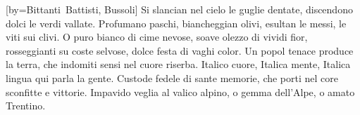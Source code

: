 [by={Bittanti\ Battisti, Bussoli}]
\chordsoff
\beginverse
Si slancian nel cielo le guglie dentate,
discendono dolci le verdi vallate.
Profumano paschi, biancheggian olivi,
esultan le messi, le viti sui clivi.
\endverse
\beginchorus
O puro bianco di cime nevose,
soave olezzo di vividi fior,
rosseggianti su coste selvose,
dolce festa di vaghi color.
\endchorus
\beginverse
Un popol tenace produce la terra,
che indomiti sensi nel cuore riserba.
Italico cuore, Italica mente,
Italica lingua qui parla la gente.
\endverse
\beginverse
Custode fedele di sante memorie,
che porti nel core sconfitte e vittorie.
Impavido veglia al valico alpino,
o gemma dell'Alpe, o amato Trentino.
\endverse
\endsong

